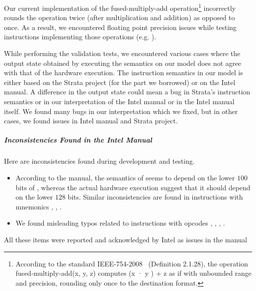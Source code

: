 Our current implementation of the fused-multiply-add operation\footnote{According to the standard IEEE-754-2008~\cite{FP} (Definition 2.1.28), the operation fused-multiply-add(x, y, z) computes (x · y ) + z as if with unbounded range and precision, rounding only once to the destination format.} incorrectly rounds the operation twice (after multiplication and addition) as opposed to once. As a result, we encountered floating point precision issues while testing instructions implementing those operations (e.g. ).  
 
While performing the validation tests, we encountered various cases where the output state obtained by executing the semantics on our model does not agree with that of the hardware execution. 
The instruction semantics in our model is either based on the Strata project (for the part we borrowed) or on the Intel manual. A difference in the output state could mean a bug in Strata's instruction semantics or in our interpretation of the Intel manual or in the Intel manual itself. We found many bugs in our interpretation which we fixed, but in other cases, we found issues  in Intel manual and Strata project.

\subparagraph{Inconsistencies Found in the Intel Manual} Here are inconsistencies found during development and testing.  
\begin{itemize}
    \item According to the manual, the semantics of  seems to depend on the lower $100$ bits of , whereas the actual hardware execution suggest that it should depend on the lower $128$ bits. Similar inconsistencies are found in instructions with mnemonics , , .
    
    \item We found misleading typos related to instructions with opcodes , , , .    
\end{itemize}
All these items were reported and acknowledged by Intel as issues in the manual~\cite{Suppl}
 
